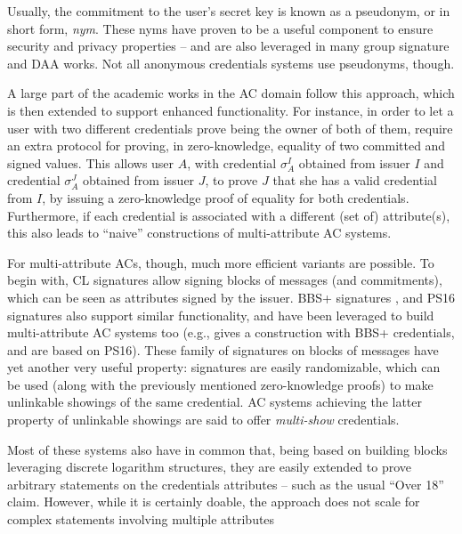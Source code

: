 Usually, the commitment to the user's secret key is known as a pseudonym, or
in short form, \emph{nym}. These nyms have proven to be a useful component to
ensure security and privacy properties -- and are also leveraged in many group
signature and DAA works. Not all anonymous credentials systems use pseudonyms,
though.

A large part of the academic works in the AC domain follow this approach, which
is then extended to support enhanced functionality. For instance, in order to
let a user with two different credentials prove being the owner of both of
them, \cite{cl01,cl02,cl04} require an extra protocol for proving, in
zero-knowledge, equality of two committed and signed values.
This allows user $A$, with credential $\sigma_A^I$ obtained from issuer $I$ and
credential $\sigma_A^J$ obtained from issuer $J$, to prove $J$ that she has a
valid credential from $I$, by issuing a zero-knowledge proof of equality for
both credentials. Furthermore, if each credential is associated with a different
(set of) attribute(s), this also leads to ``naive'' constructions of
multi-attribute AC systems.

For multi-attribute ACs, though, much more efficient variants are possible. To
begin with, CL signatures allow signing blocks of messages (and commitments),
which can be seen as attributes signed by the issuer. BBS+ signatures
\cite{asm06,cdl16b}, and PS16 signatures \cite{ps16} also support similar
functionality, and have been leveraged to build multi-attribute AC systems
too (e.g., \cite{cks10} gives a construction with BBS+ credentials, and
\cite{sms+19,halp20} are based on PS16). These family of signatures on blocks
of messages have yet another very useful property: signatures are easily
randomizable, which can be used (along with the previously mentioned
zero-knowledge proofs) to make unlinkable showings of the same credential.
AC systems achieving the latter property of unlinkable showings are said
to offer \emph{multi-show} credentials.

Most of these systems also have in common that, being based on building blocks
leveraging discrete logarithm structures, they are easily extended to prove
arbitrary statements on the credentials attributes -- such as the usual ``Over
18'' claim. However, while it is certainly doable, the approach does not scale
for complex statements involving multiple attributes 

